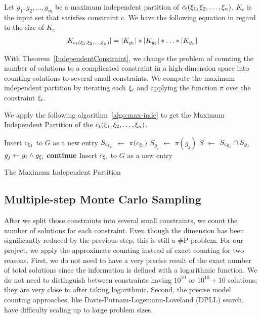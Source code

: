 \begin{theorem}
    \label{IndependentConstraint}
    Let $g_{1}, g_{2}, \ldots, g_{m}$ be a maximum independent partition of
    $c_t({\xi}_{1},{\xi}_{2},\ldots,{\xi}_{n})$.
    $K_c$ is the input set that satisfies constraint $c$. We have the following
    equation in regard to the size of $K_c$
    $$|K_{c_t({\xi}_{1},{\xi}_{2},\ldots,{\xi}_{n})}| = |K_{g_{1}}|*|K_{g_{2}}|*\ldots*|K_{g_{n}}|$$
\end{theorem}
With Theorem~\ref{IndependentConstraint}, we change the problem of counting the number of solutions to a complicated constraint in a high-dimension
space into counting solutions to several small constraints. We compute the maximum independent partition by iterating each ${\xi}_{i}$ and applying the function $\pi$ over the constraint ${\xi}_{i}$.

We apply the following
algorithm~\ref{algo:max-inde} to get the Maximum Independent Partition of the
$c_t({\xi}_{1},{\xi}_{2},\ldots,{\xi}_{n})$.


\IncMargin{1em}
\begin{algorithm}[h]\small
    \DontPrintSemicolon
    Insert $c_{{\xi}_{1}}$ to $G$ as a new entry \;
    {
        $S_{c_{{\xi}_{i}}}$ $\leftarrow$ $\pi(c_{{\xi}_{i}})$ \;
        {
            $S_{g_j}$ $\leftarrow$ $\pi(g_{j})$ \;
            $S$ $\leftarrow$ $S_{c_{{\xi}_{i}}} \cap S_{g_j}$  \;
            {
                $g_{j} \leftarrow g_{i} \land g_{{\xi}_{i}}$ \;
                \textbf{continue} \;
            }
            Insert $c_{{\xi}_{i}}$ to $G$ as a new entry \;
        }
    }
    \caption{The Maximum Independent Partition}
    \label{algo:max-inde}
\end{algorithm}
\DecMargin{1em}


\subsection{Multiple-step Monte Carlo Sampling}

After we split those constraints into several small constraints, we count the number of solutions for each constraint. Even though the dimension has been
significantly reduced by the previous step, this is still a \#P problem. For our project, we apply the approximate counting instead of exact counting for two reasons. First, we do not need to have a very precise result of the exact number of total solutions since the information is defined with a logarithmic function. We do not need to distinguish between constraints having $10^{10}$ or $10^{10} + 10$ solutions; they are very close to after taking logarithmic. Second, the
precise model counting approaches, like Davis-Putnam-Logemann-Loveland (DPLL)
search, have difficulty scaling up to large problem sizes.

